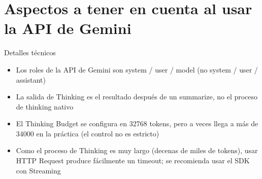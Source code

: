 \section{Aspectos a tener en cuenta al usar la API de Gemini}

\begin{knowledgebox}{Detalles técnicos}
\begin{itemize}
    \item Los roles de la API de Gemini son system / user / model (no system / user / assistant)
    \item La salida de Thinking es el resultado después de un summarize, no el proceso de thinking nativo
    \item El Thinking Budget se configura en 32768 tokens, pero a veces llega a más de 34000 en la práctica (el control no es estricto)
    \item Como el proceso de Thinking es muy largo (decenas de miles de tokens), usar HTTP Request produce fácilmente un timeout; se recomienda usar el SDK con Streaming
\end{itemize}
\end{knowledgebox}

